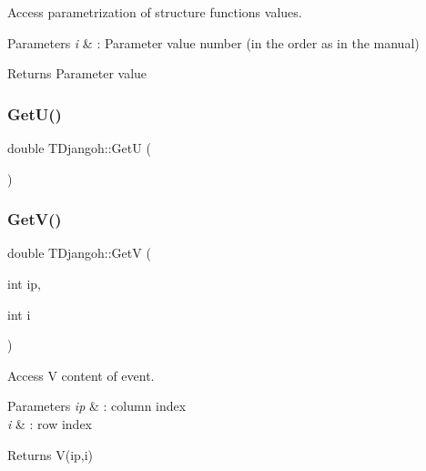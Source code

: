 Access parametrization of structure functions values. 


\begin{DoxyParams}{Parameters}
{\em i} & \+: Parameter value number (in the order as in the manual) \\
\hline
\end{DoxyParams}
\begin{DoxyReturn}{Returns}
Parameter value 
\end{DoxyReturn}
\mbox{\label{class_t_djangoh_a6e69090ac8581a1be96cac889cf5292b}} 
\subsubsection{\texorpdfstring{Get\+U()}{GetU()}}
{\footnotesize\ttfamily double T\+Djangoh\+::\+GetU (\begin{DoxyParamCaption}{ }\end{DoxyParamCaption})\hspace{0.3cm}{\ttfamily [inline]}}

\mbox{\label{class_t_djangoh_a4993a87fef8917b9ed8a55811aa2daf6}} 
\subsubsection{\texorpdfstring{Get\+V()}{GetV()}}
{\footnotesize\ttfamily double T\+Djangoh\+::\+GetV (\begin{DoxyParamCaption}\item[{int}]{ip,  }\item[{int}]{i }\end{DoxyParamCaption})\hspace{0.3cm}{\ttfamily [inline]}}



Access V content of event. 


\begin{DoxyParams}{Parameters}
{\em ip} & \+: column index \\
\hline
{\em i} & \+: row index \\
\hline
\end{DoxyParams}
\begin{DoxyReturn}{Returns}
V(ip,i) 
\end{DoxyReturn}
\mbox{\label{class_t_djangoh_a1caf80b8f7228dbc7818ac047de9b8b7}} 
